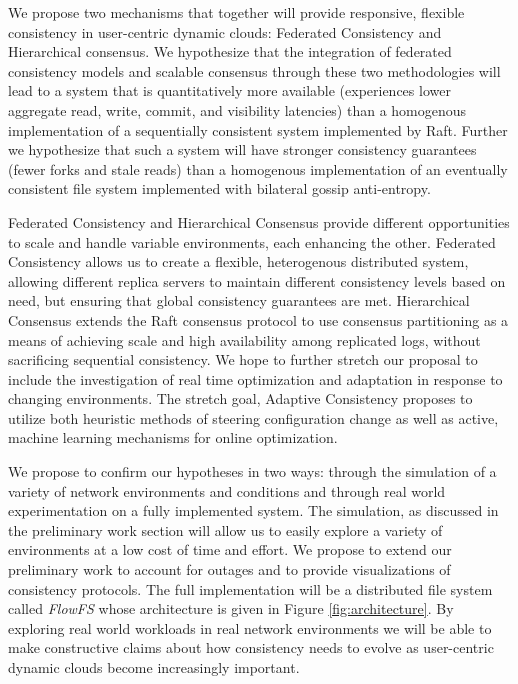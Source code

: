 \documentclass{article}
\begin{document}
We propose two mechanisms that together will provide responsive, flexible consistency in user-centric dynamic clouds: Federated Consistency and Hierarchical consensus. We hypothesize that the integration of federated consistency models and scalable consensus through these two methodologies will lead to a system that is quantitatively more available (experiences lower aggregate read, write, commit, and visibility latencies) than a homogenous implementation of a sequentially consistent system implemented by Raft. Further we hypothesize that such a system will have stronger consistency guarantees (fewer forks and stale reads) than a homogenous implementation of an eventually consistent file system implemented with bilateral gossip anti-entropy.

Federated Consistency and Hierarchical Consensus provide different opportunities to scale and handle variable environments, each enhancing the other. Federated Consistency allows us to create a flexible, heterogenous distributed system, allowing different replica servers to maintain different consistency levels based on need, but ensuring that global consistency guarantees are met. Hierarchical Consensus extends the Raft consensus protocol to use consensus partitioning as a means of achieving scale and high availability among replicated logs, without sacrificing sequential consistency. We hope to further stretch our proposal to include the investigation of real time optimization and adaptation in response to changing environments. The stretch goal, Adaptive Consistency proposes to utilize both heuristic methods of steering configuration change as well as active, machine learning mechanisms for online optimization.

We propose to confirm our hypotheses in two ways: through the simulation of a variety of network environments and conditions and through real world experimentation on a fully implemented system. The simulation, as discussed in the preliminary work section will allow us to easily explore a variety of environments at a low cost of time and effort. We propose to extend our preliminary work to account for outages and to provide visualizations of consistency protocols. The full implementation will be a distributed file system called \emph{FlowFS} whose architecture is given in Figure \ref{fig:architecture}. By exploring real world workloads in real network environments we will be able to make constructive claims about how consistency needs to evolve as user-centric dynamic clouds become increasingly important.
\end{document}
